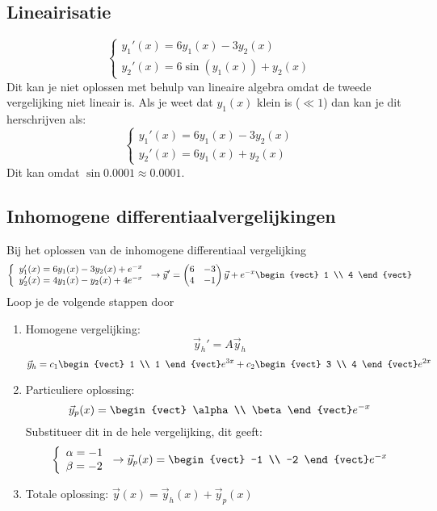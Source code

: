 \subsection{Lineairisatie}
\[ \left\{\begin{array}{l}
	y_1'(x) = 6y_1(x) - 3y_2(x) \\
	y_2'(x) = 6 \sin(y_1(x)) + y_2(x)
\end{array}\right. \]
Dit kan je niet oplossen met behulp van lineaire algebra omdat de tweede vergelijking niet lineair is. Als je weet dat $y_1(x)$ klein is ($\ll 1$) dan kan je dit herschrijven als:
\[ \left\{\begin{array}{l}
	y_1'(x) = 6y_1(x) - 3y_2(x) \\
	y_2'(x) = 6y_1(x) + y_2(x)
\end{array}\right. \]
Dit kan omdat $\sin 0.0001 \approx 0.0001$.

\subsection{Inhomogene differentiaalvergelijkingen}
Bij het oplossen van de inhomogene differentiaal vergelijking
\[ \left\{\begin{array}{l}
	y_1'(x) = 6 y_1(x) - 3y_2(x) + e^{-x} \\
	y_2'(x) = 4 y_1(x) - y_2(x) + 4e^{-x}
\end{array}\right. \to \vec{y}' = \begin{pmatrix*}[r] 6 & -3 \\ 4 & -1 \end{pmatrix*} \vec{y} + e^{-x} \begin{vect} 1 \\ 4 \end{vect} \]
Loop je de volgende stappen door
\begin{enumerate}
	\item Homogene vergelijking:
		\[ \vec{y}_h' = A \vec{y}_h \]
		\[ \vec{y}_h = c_1 \begin{vect} 1 \\ 1 \end{vect} e^{3x} + c_2 \begin{vect} 3 \\ 4 \end{vect} e^{2x} \]
	\item Particuliere oplossing:
		\[ \vec{y}_p(x) = \begin{vect} \alpha \\ \beta \end{vect} e^{-x} \]
		Substitueer dit in de hele vergelijking, dit geeft:
		\[ \left\{ \begin{array}{l} \alpha = -1 \\ \beta = -2 \end{array}\right. \to \vec{y}_p(x) = \begin{vect} -1 \\ -2 \end{vect} e^{-x} \]
	\item Totale oplossing: $\vec{y}(x) = \vec{y}_h(x) + \vec{y}_p(x)$
\end{enumerate}


